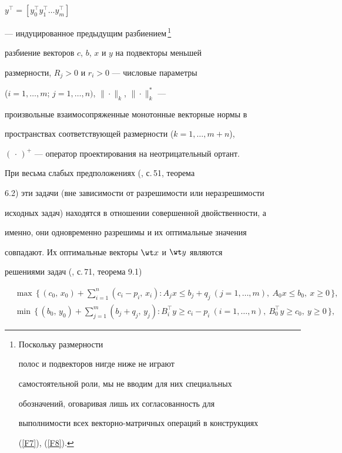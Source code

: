 $y^{\top} = [ y_0^{\top} y_1^{\top}\dotsc y_m^{\top} ]$


--- индуцированное предыдущим разбиением\,\footnote{Поскольку размерности


полос и подвекторов нигде ниже не играют


самостоятельной роли, мы не вводим для них специальных


обозначений, оговаривая лишь их согласованность для


выполнимости всех векторно-матричных операций в конструкциях


(\ref{F7}), (\ref{F8}).}


разбиение векторов $c$, $b$, $x$ и $y$ на подвекторы меньшей


размерности, $R_j >0$ и $r_i>0$ --- числовые параметры


($i=1,\dotsc,m$; $j=1,\dotsc,n)$, $\|\cdot\|_k$, $\|\cdot\|^*_k$ ---


произвольные взаимосопряженные монотонные векторные нормы в


пространствах соответствующей размерности ($k=1,\dotsc, m+n$),


$(\,\cdot\, )^+$ --- оператор проектирования на неотрицательный ортант.


\addtocounter{footnote}{-1}





При весьма слабых предположениях (\cite{14}, с.\,51, теорема


6.2) эти задачи (вне зависимости от разрешимости или неразрешимости


исходных задач) находятся в отношении совершенной двойственности, а


именно, они одновременно разрешимы и их оптимальные значения


совпадают. Их оптимальные векторы $\wt x$ и $\wt y$ являются


решениями задач (\cite{14}, с.\,71, теорема 9.1)


\begin{align}


\label{F9}


&\max\, \bigg\{\, (c_0,\,


x_0)+\sum^n_{i=1}(c_i-p_i,\, x_i): A_jx \le b_j+q_j


\ (j=1,\dotsc,m),\ A_0x \le b_0,\ x \ge 0\, \bigg\},\\


%


\label{F10}


&\min\, \bigg\{\, (b_0,\,


y_0)+\sum^m_{j=1}(b_j+q_j,\, y_j): B_i^{\top} y \ge


c_i-p_i\ (i=1,\dotsc,n),\ B_0^{\top} y \ge c_0,\ y \ge 0\,


\bigg\},


\end{align}


